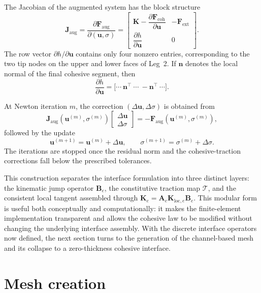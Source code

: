 \documentclass[smallextended]{svjour3}       %
\newcommand{\vb}[1]{\bm{#1}}      %
\newcommand{\mat}[1]{\mathbf{#1}}  %
\newcommand{\nvec}{\vb{n}}
\providecommand{\bn}{\nvec}
\renewcommand{\bn}{\nvec}
\begin{document}
The Jacobian of the augmented system has the block structure
\begin{equation}
	\mat J_{\mathrm{aug}}
	=
	\frac{\partial \vb F_{\mathrm{aug}}}{\partial(\vb u,\sigma)}
	=
	\begin{bmatrix}
		\mat K-\dfrac{\partial\vb F_{\mathrm{coh}}}{\partial\vb u}
		&
		-\vb F_{\mathrm{ext}}
		\\[10pt]
		\dfrac{\partial h}{\partial\vb u}
		&
		0
	\end{bmatrix}.
	\label{eq:aug-J}
\end{equation}
The row vector \(\partial h/\partial\vb u\) contains only four nonzero
entries, corresponding to the two tip nodes on the upper and lower faces of
Leg~2. If \(\bn\) denotes the local normal of the final cohesive segment,
then
\[
\frac{\partial h}{\partial\vb u}
=
\big[
\cdots\ \bn^\top\ \cdots\ -\bn^\top\ \cdots
\big].
\]

At Newton iteration \(m\), the correction
\((\Delta\vb u,\Delta\sigma)\) is obtained from
\begin{equation}
	\mat J_{\mathrm{aug}}(\vb u^{(m)},\sigma^{(m)})
	\begin{bmatrix}
		\Delta\vb u\\
		\Delta\sigma
	\end{bmatrix}
	=
	-
	\vb F_{\mathrm{aug}}(\vb u^{(m)},\sigma^{(m)}),
	\label{eq:newton-aug}
\end{equation}
followed by the update
\[
\vb u^{(m+1)}=\vb u^{(m)}+\Delta\vb u,
\qquad
\sigma^{(m+1)}=\sigma^{(m)}+\Delta\sigma.
\]
The iterations are stopped once the residual norm and the cohesive-traction
corrections fall below the prescribed tolerances.

This construction separates the interface formulation into three distinct
layers: the kinematic jump operator \(\mat B_e\), the constitutive traction
map \(\mathcal T\), and the consistent local tangent assembled through
\(\mat K_e=\mat A_e\mat K_{\mathrm{loc},e}\mat B_e\). This modular form is
useful both conceptually and computationally: it makes the finite-element
implementation transparent and allows the cohesive law to be modified without
changing the underlying interface assembly. With the discrete interface
operators now defined, the next section turns to the generation of the
channel-based mesh and its collapse to a zero-thickness cohesive interface.

\section{Mesh creation}
\label{sec:mesh}
\end{document}
